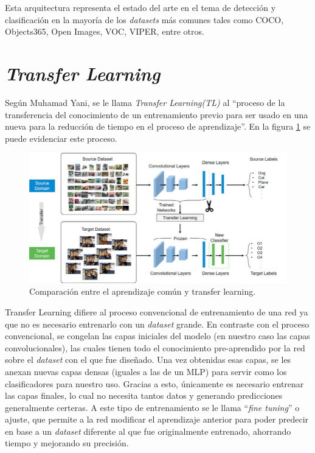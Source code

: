 Esta arquitectura representa el estado del arte en el tema de detección y clasificación en la mayoría de los \textit{datasets} más comunes tales como COCO, Objects365, Open Images, VOC, VIPER, entre otros.  

\section{\textit{Transfer Learning}}
Según Muhamad Yani\cite{Yani2019}, se le llama \textit{Transfer Learning(TL)} al ``proceso de la transferencia del conocimiento de un entrenamiento previo para ser usado en una nueva para la reducción de tiempo en el proceso de aprendizaje''. En la figura \ref{transfer-learning} se puede evidenciar este proceso.\\ 

\begin{figure}[h!]
\includegraphics[width=1\textwidth]{images/transfer-learning.png}
\centering
\caption{Comparación entre el aprendizaje común y transfer learning. \protect\cite{transfer-learning}}
\label{transfer-learning}
\end{figure}

Transfer Learning difiere al proceso convencional de entrenamiento de una red ya que no es necesario entrenarlo con un \textit{dataset} grande. En contraste con el proceso convencional, se congelan las capas iniciales del modelo (en nuestro caso las capas convolucionales), las cuales tienen todo el conocimiento pre-aprendido por la red sobre el \textit{dataset} con el que fue diseñado. Una vez obtenidas esas capas, se les anexan nuevas capas densas (iguales a las de un MLP) para servir como los clasificadores para nuestro uso. Gracias a esto, únicamente es necesario entrenar las capas finales, lo cual no necesita tantos datos y generando predicciones generalmente certeras. A este tipo de entrenamiento se le llama ``\textit{fine tuning}'' o ajuste, que permite a la red modificar el aprendizaje anterior para poder predecir en base a un \textit{dataset} diferente al que fue originalmente entrenado, ahorrando tiempo y mejorando su precisión.

